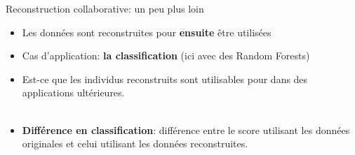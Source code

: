 \documentclass[hyperref={pdfpagelabels=false}]{beamer}
\begin{document}
    \begin{frame}{Reconstruction collaborative: un peu plus loin}
        \begin{itemize}
            \item Les données sont reconstruites pour \textbf{ensuite} être 
                utilisées
            \item Cas d'application: \textbf{la classification} (ici avec des 
                Random Forests)
            \item Est-ce que les individus reconstruits sont utilisables pour 
                dans des applications ultérieures.\\~\\
            \item \textbf{Différence en classification}: différence entre le 
                score utilisant les données originales et celui utilisant les 
                données reconstruites.
        \end{itemize}
    \end{frame}
\end{document}
